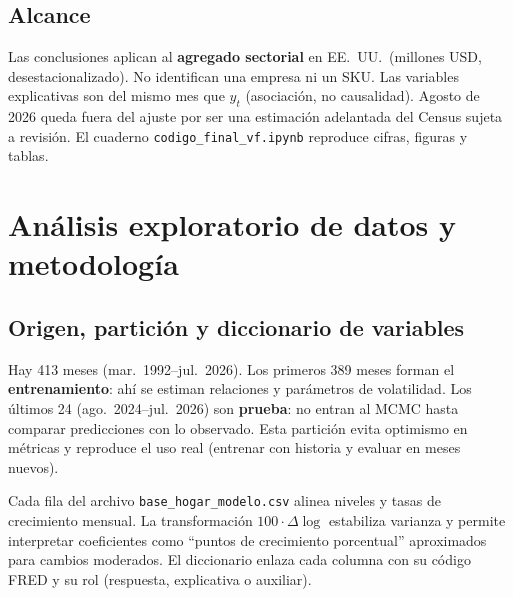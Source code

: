\documentclass[twocolumn,10pt]{article}
\begin{document}
\subsection{Alcance}
Las conclusiones aplican al \textbf{agregado sectorial} en EE.\ UU.\ (millones USD, desestacionalizado). No identifican una empresa ni un SKU. Las variables explicativas son del mismo mes que $y_t$ (asociación, no causalidad). Agosto de 2026 queda fuera del ajuste por ser una estimación adelantada del Census sujeta a revisión. El cuaderno \texttt{codigo\_final\_vf.ipynb} reproduce cifras, figuras y tablas.

\section{Análisis exploratorio de datos y metodología}

\subsection{Origen, partición y diccionario de variables}
Hay 413 meses (mar.\ 1992--jul.\ 2026). Los primeros 389 meses forman el \textbf{entrenamiento}: ahí se estiman relaciones y parámetros de volatilidad. Los últimos 24 (ago.\ 2024--jul.\ 2026) son \textbf{prueba}: no entran al MCMC hasta comparar predicciones con lo observado. Esta partición evita optimismo en métricas y reproduce el uso real (entrenar con historia y evaluar en meses nuevos).

Cada fila del archivo \texttt{base\_hogar\_modelo.csv} alinea niveles y tasas de crecimiento mensual. La transformación $100\cdot\Delta\log$ estabiliza varianza y permite interpretar coeficientes como ``puntos de crecimiento porcentual'' aproximados para cambios moderados. El diccionario enlaza cada columna con su código FRED y su rol (respuesta, explicativa o auxiliar).
\end{document}
